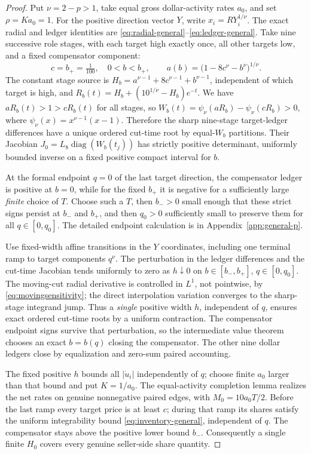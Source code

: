 \documentclass[review,hidelinks,onefignum,onetabnum]{siamonline250211}%
\begin{document}
\begin{proof}
Put $\nu=2-p>1$, take equal gross dollar-activity rates
$a_0$, and set $\rho=Ka_0=1$. For the positive direction vector
$Y$, write $x_i=R Y_i^{1/\nu}$. The exact radial and ledger
identities are \eqref{eq:radial-general}--\eqref{eq:ledger-general}.
Take nine successive role stages, with each target high exactly
once, all other targets low, and a fixed compensator component:
\[
 c=b_+=\tfrac1{100},\quad 0<b<b_+,\qquad
 a(b)=\bigl(1-8c^\nu-b^\nu\bigr)^{1/\nu}.
\]
The constant stage source is
$H_b=a^{\nu-1}+8c^{\nu-1}+b^{\nu-1}$, independent of
which target is high, and
$R_b(t)=H_b+(10^{1/\nu}-H_b)e^{-t}$. We have
$aR_b(t)>1>cR_b(t)$ for all stages, so
$W_b(t)=\psi_\nu(aR_b)-\psi_\nu(cR_b)>0$, where
$\psi_\nu(x)=x^{\nu-1}(x-1)$. Therefore the sharp
nine-stage target-ledger differences have a unique ordered
cut-time root by equal-$W_b$ partitions. Their Jacobian
$J_0=L_8\operatorname{diag}(W_b(t_j))$ has strictly
positive determinant, uniformly bounded inverse on a fixed
positive compact interval for $b$.

At the formal endpoint $q=0$ of the last target direction,
the compensator ledger is positive at $b=0$, while for the
fixed $b_+$ it is negative for a sufficiently large \emph{finite}
choice of $T$. Choose such a $T$, then $b_->0$ small enough
that these strict signs persist at $b_-$ and $b_+$, and
then $q_0>0$ sufficiently small to preserve them for
all $q\in[0,q_0]$. The detailed endpoint calculation is in
Appendix~\ref{app:general-p}.

Use fixed-width affine transitions in the $Y$ coordinates,
including one terminal ramp to target components $q^\nu$.
The perturbation in the ledger differences and the cut-time
Jacobian tends uniformly to zero as $h\downarrow0$ on
$b\in[b_-,b_+]$, $q\in[0,q_0]$. The moving-cut radial
derivative is controlled in $L^1$, not pointwise, by
\eqref{eq:movingsensitivity}; the direct interpolation
variation converges to the sharp-stage integrand jump.
Thus a \emph{single} positive width $h$, independent of $q$,
ensures exact ordered cut-time roots by a uniform contraction.
The compensator endpoint signs survive that perturbation, so
the intermediate value theorem chooses an exact
$b=b(q)$ closing the compensator. The other nine dollar
ledgers close by equalization and zero-sum paired accounting.

The fixed positive $h$ bounds all $|\dot u_i|$ independently
of $q$; choose finite $a_0$ larger than that bound and put
$K=1/a_0$. The equal-activity completion lemma realizes the
net rates on genuine nonnegative paired edges, with
$M_0=10a_0T/2$. Before the last ramp every target price is
at least $c$; during that ramp its shares satisfy the
uniform integrability bound
\eqref{eq:inventory-general}, independent of $q$.
The compensator stays above the positive lower bound $b_-$.
Consequently a single finite $H_0$ covers every genuine
seller-side share quantity.


\end{proof}
\end{document}
